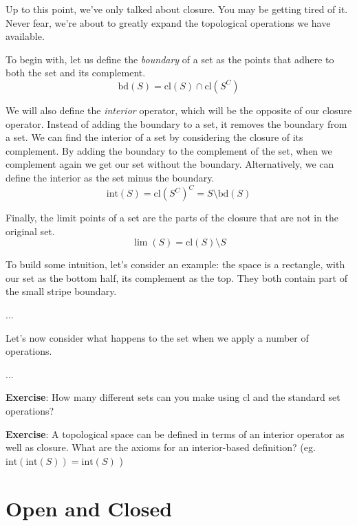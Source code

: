 \documentclass{report}
\newcommand{\cl}{\mathrm{cl}}
\newcommand{\intr}{\mathrm{int}}
\newcommand{\bd}{\mathrm{bd}}
\begin{document}
Up to this point, we've only talked about closure. You may be getting tired of it. Never fear, we're about to greatly expand the topological operations we have available.

To begin with, let us define the \emph{boundary} of a set as the points that adhere to both the set and its complement. $$\bd(S) = \cl(S)∩\cl(S^C)$$

We will also define the \emph{interior} operator, which will be the opposite of our closure operator. Instead of adding the boundary to a set, it removes the boundary from a set. We can find the interior of a set by considering the closure of its complement. By adding the boundary to the complement of the set, when we complement again we get our set without the boundary. Alternatively, we can define the interior as the set minus the boundary. $$\intr(S) = \cl(S^C)^C = S \setminus \bd(S)$$

Finally, the limit points of a set are the parts of the closure that are not in the original set. $$\lim(S) = \cl(S) \setminus S$$

To build some intuition, let's consider an example: the space is a rectangle, with our set as the bottom half, its complement as the top. They both contain part of the small stripe boundary.

...

Let's now consider what happens to the set when we apply a number of operations.

...

{\bf Exercise}: How many different sets can you make using $\cl$ and the standard set operations? %

{\bf Exercise}: A topological space can be defined in terms of an interior operator as well as closure. What are the axioms for an interior-based definition? (eg. $\intr(\intr(S)) = \intr(S)$ )


\section{Open and Closed}
\end{document}
